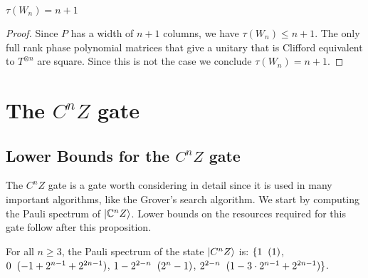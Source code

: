 \documentclass[12pt]{dalthesis}
\begin{document}
\begin{lemma}
$\tau (W_n) = n + 1$
\end{lemma}
\begin{proof}
Since $P$ has a width of $n+1$ columns, we have $\tau (W_n) \leq n+1$. The only full rank phase polynomial matrices that give a unitary that is Clifford equivalent to $T^{\otimes n}$ are square. Since this is not the case we conclude $\tau (W_n) = n + 1$.
\end{proof}



\section{The $C^nZ$ gate}
\subsection{Lower Bounds for the $C^nZ$ gate}
The $C^n Z$ gate is a gate worth considering in detail since it is used in many important algorithms, like the Grover's search algorithm. We start by computing the Pauli spectrum of $\ket{\mathbb{C}^nZ}$. Lower bounds on the resources required for this gate follow after this proposition.

\begin{proposition}
\label{prop4.2}
For all $n \geq 3$, the Pauli spectrum of the state $\ket{C^n Z}$ is: $\{ 1 \hspace{2mm} (1)$, $0 \hspace{2mm} (-1 +2^{n-1} + 2^{2n-1})$, $1-2^{2-n} \hspace{2mm} (2^n-1)$, $2^{2-n}  \hspace{2mm} (1-3 \cdot 2^{n-1} + 2^{2n-1}) \}$.
\end{proposition}
\end{document}
